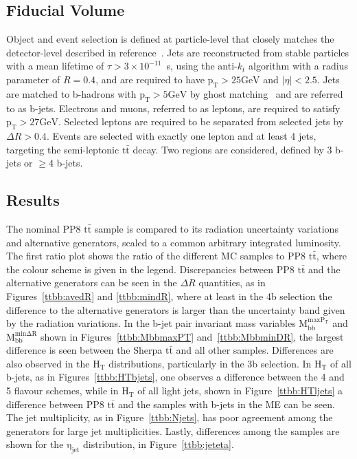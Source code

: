 \subsection{Fiducial Volume}
Object and event selection is defined at particle-level that closely matches the detector-level described in reference~\cite{HIGG-2017-03}. Jets are reconstructed from stable particles with a mean lifetime of $\tau > 3\times 10^{-11}$~s, using the anti-$k_t$ algorithm with a radius parameter of $R=0.4$, and are required to have $\mathrm{p_{T}>25 GeV}$ and $|\eta|< 2.5$. Jets are matched to b-hadrons with $\mathrm{p_{T}>5 GeV}$ by ghost matching~\cite{Cacciari:2008gn} and are referred to as b-jets. Electrons and muons, referred to as leptons, are required to satisfy $\mathrm{p_{T}>27 GeV}$. Selected leptons are required to be separated from selected jets by $\Delta R>0.4$. Events are selected with exactly one lepton and at least 4 jets, targeting the semi-leptonic $\mathrm{t\bar{t}}$ decay.
Two regions are considered, defined by 3 b-jets or $\geq$4 b-jets.

\subsection{Results}
The nominal PP8 $\mathrm{t\bar{t}}$ sample is compared to its radiation uncertainty variations and alternative generators, scaled to a common arbitrary integrated luminosity.
The first ratio plot shows the ratio of the different MC samples to PP8 $\mathrm{t\bar{t}}$, where the colour scheme is given in the legend.
Discrepancies between PP8 $\mathrm{t\bar{t}}$ and the alternative generators can be seen in the $\Delta R$ quantities, as in Figures~\ref{ttbb:avedR} and \ref{ttbb:mindR}, where at least in the 4b selection the difference to the alternative generators is larger than the uncertainty band given by the radiation variations.  
In the b-jet pair invariant mass variables $\mathrm{M_{bb}^{max P_T}}$ and $\mathrm{M_{bb}^{min \Delta R}}$ shown in Figures~\ref{ttbb:MbbmaxPT} and~\ref{ttbb:MbbminDR}, the largest difference is seen between the Sherpa $\mathrm{t\bar{t}}$ and all other samples.
Differences are also observed in the $\mathrm{H_T}$ distributions, particularly in the 3b selection. In $\mathrm{H_T}$ of all b-jets, as in Figures~\ref{ttbb:HTbjets}, one observes a difference between the 4 and 5 flavour schemes, while in $\mathrm{H_T}$ of all light jets, shown in Figure~\ref{ttbb:HTljets} a difference between PP8 $\mathrm{t\bar{t}}$ and the samples with b-jets in the ME can be seen. The jet multiplicity, as in Figure~\ref{ttbb:Njets}, has poor agreement among the generators for large jet multiplicities.
Lastly, differences among the samples are shown for the $\mathrm{\eta_{jet}}$ distribution, in Figure~\ref{ttbb:jeteta}.

